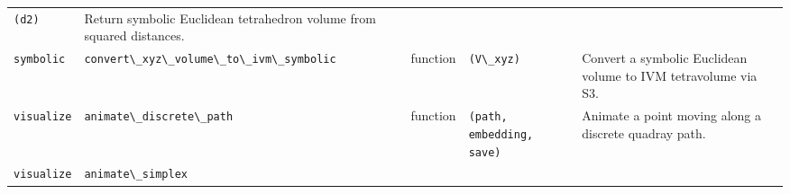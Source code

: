 \documentclass[
  10pt,
]{article}
\newcommand{\passthrough}[1]{#1}
\begin{document}
\begin{longtable}[]{@{}lllll@{}}
\begin{minipage}[t]{0.17\columnwidth}
\passthrough{\lstinline!(d2)!}\strut
\end{minipage} & \begin{minipage}[t]{0.17\columnwidth}\raggedright
Return symbolic Euclidean tetrahedron volume from squared
distances.\strut
\end{minipage}\tabularnewline
\begin{minipage}[t]{0.17\columnwidth}\raggedright
\passthrough{\lstinline!symbolic!}\strut
\end{minipage} & \begin{minipage}[t]{0.17\columnwidth}\raggedright
\passthrough{\lstinline!convert\_xyz\_volume\_to\_ivm\_symbolic!}\strut
\end{minipage} & \begin{minipage}[t]{0.17\columnwidth}\raggedright
function\strut
\end{minipage} & \begin{minipage}[t]{0.17\columnwidth}\raggedright
\passthrough{\lstinline!(V\_xyz)!}\strut
\end{minipage} & \begin{minipage}[t]{0.17\columnwidth}\raggedright
Convert a symbolic Euclidean volume to IVM tetravolume via S3.\strut
\end{minipage}\tabularnewline
\begin{minipage}[t]{0.17\columnwidth}\raggedright
\passthrough{\lstinline!visualize!}\strut
\end{minipage} & \begin{minipage}[t]{0.17\columnwidth}\raggedright
\passthrough{\lstinline!animate\_discrete\_path!}\strut
\end{minipage} & \begin{minipage}[t]{0.17\columnwidth}\raggedright
function\strut
\end{minipage} & \begin{minipage}[t]{0.17\columnwidth}\raggedright
\passthrough{\lstinline!(path, embedding, save)!}\strut
\end{minipage} & \begin{minipage}[t]{0.17\columnwidth}\raggedright
Animate a point moving along a discrete quadray path.\strut
\end{minipage}\tabularnewline
\begin{minipage}[t]{0.17\columnwidth}\raggedright
\passthrough{\lstinline!visualize!}\strut
\end{minipage} & \begin{minipage}[t]{0.17\columnwidth}\raggedright
\passthrough{\lstinline!animate\_simplex!}\strut

\end{minipage}
\end{longtable}
\end{document}
